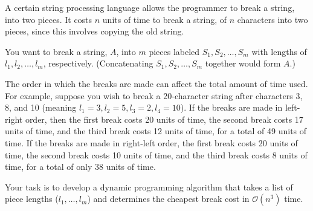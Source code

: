 \documentclass[12pt]{exam}
\newcommand{\stars}[1]{%
    \foreach \n in {1,...,#1}{%
        $\filledstar$%
    }%
}
\begin{document}
\begin{questions}

    \clearpage

    \question[50] [W10, \stars{5}] A certain string processing language allows the programmer to break a string, into two pieces. It costs $n$ units of time to break a string, of $n$ characters into two
    pieces, since this involves copying the old string.

    You want to break a string, $A$, into $m$ pieces labeled $S_1, S_2, \dots, S_m$ with lengths of $l_1, l_2, \dots, l_m$, respectively. (Concatenating $S_1, S_2, \dots, S_{m}$ together would form $A$.)

    The order in which the breaks are made can affect the total amount of time used. For example, suppose you wish to break a 20-character string after characters 3, 8, and 10 (meaning $l_1=3, l_2=5, l_3=2, l_4=10$). If the breaks are made in left-right order, then the first break costs 20 units of time, the second break costs 17 units of time, and the third break costs 12 units of time, for a total of 49 units of time. If the breaks are made in right-left order, the first break costs 20 units of time, the second break costs 10 units of time, and the third break costs 8 units of time, for a total of only 38 units of time.

    Your task is to develop a dynamic programming algorithm that takes a list of piece lengths ($l_1, \dots, l_m$) and determines the cheapest break cost in $\mathcal{O}(n^3)$ time.

    \begin{parts}

\end{parts}
\end{questions}
\end{document}
